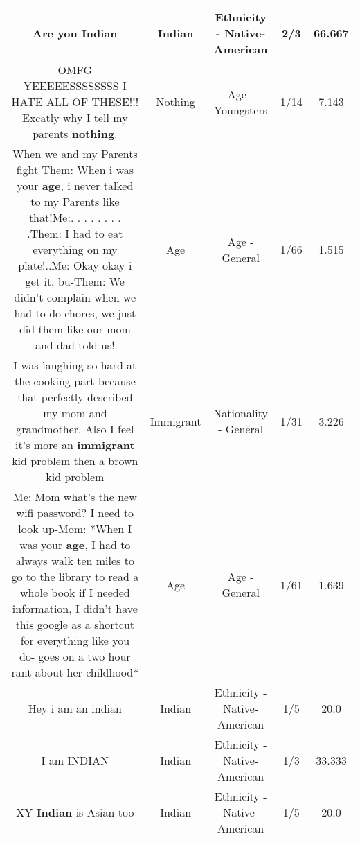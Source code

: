 \documentclass[11pt]{article}
\newlength\mylength
\begin{document}
\begin{center}
\begin{longtable}{|C{.65\mylength}|C{.30\mylength}|C{.12\mylength}|C{.12\mylength}|C{.12\mylength}|}
  \small Are you Indian\normalsize   & Indian & Ethnicity - Native-American & 2/3 & 66.667 \\  \hline
  \small OMFG YEEEEESSSSSSSS I HATE ALL OF THESE!!! Excatly why I tell my parents \textbf{nothing}.\normalsize   & Nothing & Age - Youngsters & 1/14 & 7.143 \\  \hline
  \small When we and my Parents fight Them: When i was your \textbf{age}, i never talked to my Parents like that!Me:. . . . . . . . .Them: I had to eat everything on my plate!..Me: Okay okay i get it, bu-Them: We didn't complain when we had to do chores, we just did them like our mom and dad told us!\normalsize   & Age & Age - General & 1/66 & 1.515 \\  \hline
  \small I was laughing so hard at the cooking part because that perfectly described my mom and grandmother. Also I feel it's more an \textbf{immigrant} kid problem then a brown kid problem\normalsize   & Immigrant & Nationality - General & 1/31 & 3.226 \\  \hline
  \small Me: Mom what's the new wifi password? I need to look up-Mom: *When I was your \textbf{age}, I had to always walk ten miles to go to the library to read a whole book if I needed information, I didn't have this google as a shortcut for everything like you do- goes on a two hour rant about her childhood*\normalsize   & Age & Age - General & 1/61 & 1.639 \\  \hline
  \small Hey i am an indian\normalsize   & Indian & Ethnicity - Native-American & 1/5 & 20.0 \\  \hline
  \small I am INDIAN\normalsize   & Indian & Ethnicity - Native-American & 1/3 & 33.333 \\  \hline
  \small XY \textbf{Indian} is Asian too\normalsize   & Indian & Ethnicity - Native-American & 1/5 & 20.0 \\  \hline

\end{longtable}
\end{center}
\end{document}
